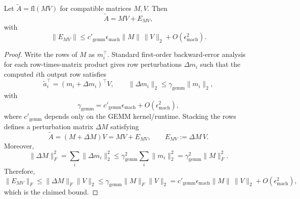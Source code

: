 \documentclass[10pt,a4paper]{amsart}
\begin{document}
\begin{lemma}
\label{lem:gemm-out}
Let $\widetilde{A}=\mathrm{fl}(MV)$ for compatible matrices $M,V$. Then
\[
\widetilde{A}=MV+E_{MV},
\]
with
\[
\|E_{MV}\|
\le
c'_{\mathrm{gemm}}\epsilon_{\mathrm{mach}}\|M\|\,\|V\|_2
+ O(\epsilon_{\mathrm{mach}}^2).
\]
\end{lemma}

\begin{proof}
Write the rows of $M$ as $m_i^\top$. Standard first-order backward-error
analysis for each row-times-matrix product gives row perturbations
$\Delta m_i$ such that the computed $i$th output row satisfies
\[
\widetilde a_i^\top
=
(m_i+\Delta m_i)^\top V,
\qquad
\|\Delta m_i\|_2
\le
\gamma_{\mathrm{gemm}}\|m_i\|_2,
\]
with
\[
\gamma_{\mathrm{gemm}}
=
c'_{\mathrm{gemm}}\epsilon_{\mathrm{mach}}
+ O(\epsilon_{\mathrm{mach}}^2),
\]
where $c'_{\mathrm{gemm}}$ depends only on the GEMM kernel/runtime. Stacking the
rows defines a perturbation matrix $\Delta M$ satisfying
\[
\widetilde A
=
(M+\Delta M)V
=
MV + E_{MV},
\qquad
E_{MV}:=\Delta M\,V.
\]
Moreover,
\[
\|\Delta M\|_F^2
=
\sum_i \|\Delta m_i\|_2^2
\le
\gamma_{\mathrm{gemm}}^2
\sum_i \|m_i\|_2^2
=
\gamma_{\mathrm{gemm}}^2\|M\|_F^2.
\]
Therefore,
\[
\|E_{MV}\|_F
\le
\|\Delta M\|_F\|V\|_2
\le
\gamma_{\mathrm{gemm}}\|M\|_F\|V\|_2
=
c'_{\mathrm{gemm}}\epsilon_{\mathrm{mach}}\|M\|\,\|V\|_2
+ O(\epsilon_{\mathrm{mach}}^2),
\]
which is the claimed bound.
\end{proof}
\end{document}
